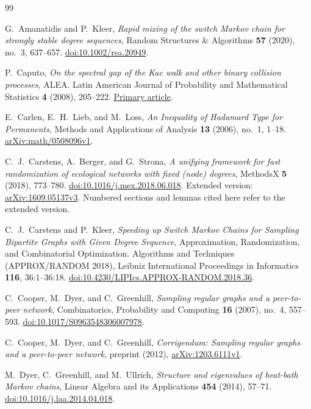 \begin{thebibliography}{99}

G.~Amanatidis and P.~Kleer,
\emph{Rapid mixing of the switch Markov chain for strongly stable degree sequences},
Random Structures \& Algorithms \textbf{57} (2020), no.~3, 637--657.
\href{https://doi.org/10.1002/rsa.20949}{doi:10.1002/rsa.20949}.

P.~Caputo,
\emph{On the spectral gap of the Kac walk and other binary collision processes},
ALEA. Latin American Journal of Probability and Mathematical Statistics
\textbf{4} (2008), 205--222.
\href{https://alea.impa.br/articles/v4/04-10.pdf}{Primary article}.

E.~Carlen, E.~H.~Lieb, and M.~Loss,
\emph{An Inequality of Hadamard Type for Permanents},
Methods and Applications of Analysis \textbf{13} (2006), no.~1, 1--18.
\href{https://arxiv.org/abs/math/0508096v1}{arXiv:math/0508096v1}.

C.~J.~Carstens, A.~Berger, and G.~Strona,
\emph{A unifying framework for fast randomization of ecological networks with fixed (node) degrees},
MethodsX \textbf{5} (2018), 773--780.
\href{https://doi.org/10.1016/j.mex.2018.06.018}{doi:10.1016/j.mex.2018.06.018}.
Extended version: \href{https://arxiv.org/abs/1609.05137v3}{arXiv:1609.05137v3}.
Numbered sections and lemmas cited here refer to the extended version.

C.~J.~Carstens and P.~Kleer,
\emph{Speeding up Switch Markov Chains for Sampling Bipartite Graphs
with Given Degree Sequence},
Approximation, Randomization, and Combinatorial Optimization.
Algorithms and Techniques (APPROX/RANDOM 2018),
Leibniz International Proceedings in Informatics \textbf{116}, 36:1--36:18.
\href{https://doi.org/10.4230/LIPIcs.APPROX-RANDOM.2018.36}{doi:10.4230/LIPIcs.APPROX-RANDOM.2018.36}.

C.~Cooper, M.~Dyer, and C.~Greenhill,
\emph{Sampling regular graphs and a peer-to-peer network},
Combinatorics, Probability and Computing \textbf{16} (2007), no.~4, 557--593.
\href{https://doi.org/10.1017/S0963548306007978}{doi:10.1017/S0963548306007978}.

C.~Cooper, M.~Dyer, and C.~Greenhill,
\emph{Corrigendum: Sampling regular graphs and a peer-to-peer network},
preprint (2012),
\href{https://arxiv.org/abs/1203.6111v1}{arXiv:1203.6111v1}.

M.~Dyer, C.~Greenhill, and M.~Ullrich,
\emph{Structure and eigenvalues of heat-bath Markov chains},
Linear Algebra and its Applications \textbf{454} (2014), 57--71.
\href{https://doi.org/10.1016/j.laa.2014.04.018}{doi:10.1016/j.laa.2014.04.018}.


\end{thebibliography}
